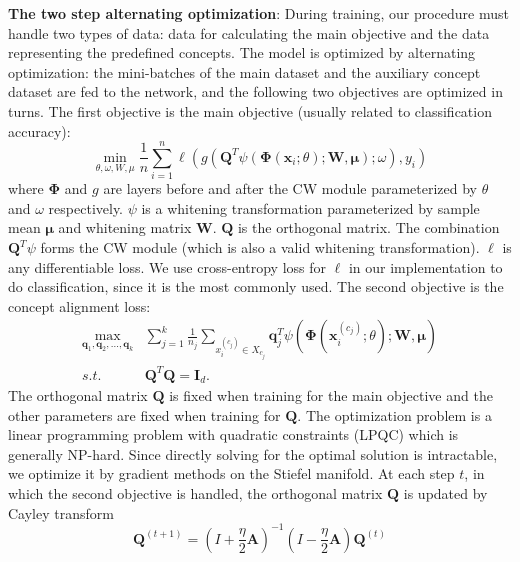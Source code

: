 \documentclass{article}
\begin{document}
\textbf{The two step alternating optimization}: During training, our procedure must handle two types of data: data for calculating the main objective and the data representing the predefined concepts. The model is optimized by alternating optimization: the mini-batches of the main dataset and the auxiliary concept dataset are fed to the network, and the following two objectives are optimized in turns. The first objective is the main objective (usually related to classification accuracy):
\begin{equation}
    \min_{\theta, \omega, W, \mu} \frac{1}{n}\sum_{i=1}^{n}\ell(g(\mathbf{Q}^T\psi(\mathbf{\Phi}(\mathbf{x}_i;\theta);\mathbf{W},\mathbf{\mu});\omega),y_i)
\end{equation}
where $\mathbf{\Phi}$ and $g$ are layers before and after the CW module parameterized by $\theta$ and $\omega$ respectively. $\psi$ is a whitening transformation parameterized by sample mean $\mathbf{\mu}$ and whitening matrix $\mathbf{W}$. $\mathbf{Q}$ is the orthogonal matrix. The combination $\mathbf{Q}^T\psi$ forms the CW module (which is also a valid whitening transformation). $\ell$ is any differentiable loss. We use cross-entropy loss for $\ell$ in our implementation to do classification, since it is the most commonly used. The second objective is the concept alignment loss:
\begin{equation}
    \begin{aligned}
        \max_{\mathbf{q}_1,\mathbf{q}_2,...,\mathbf{q}_k}  &\sum_{j=1}^{k}\frac{1}{n_j}\sum_{x_i^{(c_j)}\in X_{c_j}}\mathbf{q}_j^T\psi(\mathbf{\Phi}(\mathbf{x}_{i}^{(c_j)};\theta);\mathbf{W},\mathbf{\mu}) \\
        s.t.\ &\mathbf{Q}^T\mathbf{Q}=\mathbf{I}_d.
    \end{aligned}
\end{equation}
The orthogonal matrix $\mathbf{Q}$ is fixed when training for the main objective and the other parameters are fixed when training for $\mathbf{Q}$. The optimization problem is a linear programming problem with quadratic constraints (LPQC) which is generally NP-hard. Since directly solving for the optimal solution is intractable, we optimize it by gradient methods on the Stiefel manifold. 
At each step $t$, in which the second objective is handled, the orthogonal matrix $\mathbf{Q}$ is updated by Cayley transform
$$\mathbf{Q}^{(t+1)}=\left(I+\frac{\eta}{2}\mathbf{A}\right)^{-1}\left(I-\frac{\eta}{2}\mathbf{A}\right)\mathbf{Q}^{(t)}$$
\end{document}

